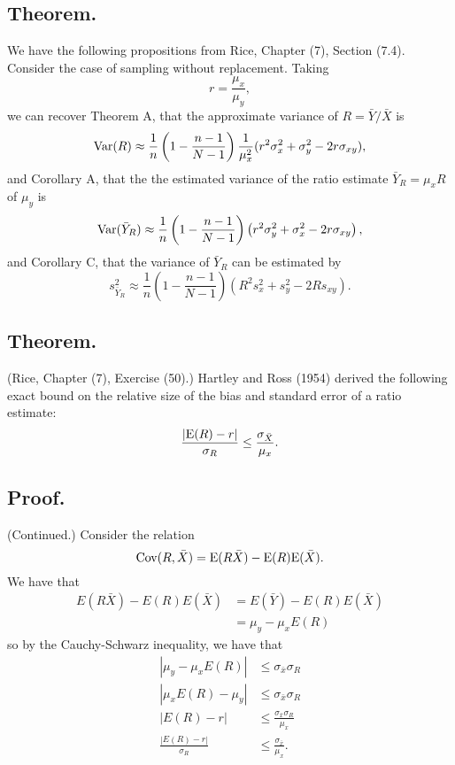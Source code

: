 \documentclass[titlepage]{article}
\begin{document}
\subsection{Theorem.} We have the following propositions from Rice, Chapter (7), Section (7.4). Consider the case of sampling without replacement. Taking 
$$r = \frac{\mu_{x}}{\mu_{y}},$$
we can recover Theorem A, that the approximate variance of $R = \bar{Y}/\bar{X}$ is 
$$\text{Var}(R) \approx \frac{1}{n}\left(1 - \frac{n-1}{N-1}\right)\frac{1}{\mu_{x}^{2}}
                  (r^{2}\sigma_{x}^{2} + \sigma_{y}^{2} - 2r\sigma_{xy}),$$
and Corollary A, that the the estimated variance of the ratio estimate $\bar{Y}_{R} = \mu_{x}R$ of $\mu_{y}$ is 
$$\text{Var}(\bar{Y}_{R}) \approx \frac{1}{n}\left(1 - \frac{n-1}{N-1}\right)\left(r^{2}\sigma_{y}^{2} 
                  + \sigma_{x}^{2} - 2r\sigma_{xy}\right),$$
and Corollary C, that the variance of $\bar{Y}_{R}$ can be estimated by 
$$s^{2}_{\bar{Y}_{R}} \approx \frac{1}{n}\left(1 - \frac{n-1}{N-1}\right)(R^{2}s_{x}^{2} + s_{y}^{2} - 2Rs_{xy}).$$

\subsection{Theorem.} (Rice, Chapter (7), Exercise (50).) Hartley and Ross (1954) derived the following exact bound on the relative size of the bias and 
standard error of a ratio estimate:
$$\frac{|\text{E}(R) - r|}{\sigma_{R}} \leq \frac{\sigma_{\bar{X}}}{\mu_{x}}.$$

\subsection{Proof.} (Continued.) Consider the relation
$$\text{Cov}(R, \bar{X}) = \text{E}(R\bar{X}) - \text{E}(R)\text{E}(\bar{X}).$$
We have that 
\begin{align*}
    E(R\bar{X}) - E(R)E(\bar{X}) &= E(\bar{Y}) - E(R)E(\bar{X}) \\
                                 &= \mu_{y} - \mu_{x}E(R)
\end{align*}
so by the Cauchy-Schwarz inequality, we have that 
\begin{align*}
    |\mu_{y} - \mu_{x}E(R)| &\leq \sigma_{\bar{x}}\sigma_{R} \\
    |\mu_{x}E(R) - \mu_{y}| &\leq \sigma_{\bar{x}}\sigma_{R} \\
    |E(R) - r| &\leq \frac{\sigma_{\bar{x}}\sigma_{R}}{\mu_{x}} \\
    \frac{|E(R) - r|}{\sigma_{R}} &\leq \frac{\sigma_{\bar{x}}}{\mu_{x}}.
\end{align*}
\end{document}
